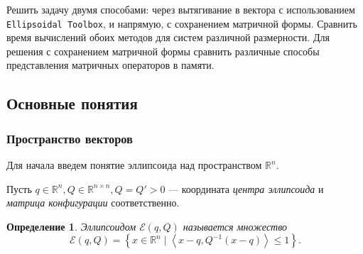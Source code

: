 \documentclass[12pt]{article}
\theoremstyle{rusdef}
\newtheorem{definition}{Определение}
\newcommand{\scalar}[2]{\left<#1,#2\right>}
\newcommand{\R}{\ensuremath{\mathbb{R}}} %
\newcommand{\E}{\ensuremath{\mathcal{E}}} %
\begin{document}
Решить задачу двумя способами: через вытягивание в вектора с использованием \texttt{Ellipsoidal Toolbox}, и напрямую, с сохранением матричной формы. Сравнить время вычислений обоих методов для систем различной размерности. Для решения с сохранением матричной формы сравнить различные способы представления матричных операторов в памяти.
\newpage


\subsection{Основные понятия}
\subsubsection*{Пространство векторов}
Для начала введем понятие эллипсоида над пространством $\R^n$.

Пусть $q \in \R^n, Q \in \R^{n \times n}, Q = Q' > 0$ --- координата \textit{центра эллипсоида} и \textit{матрица конфигурации} соответственно.

\begin{definition}
Эллипсоидом $\E(q,Q)$ называется множество
$$
\E(q,Q) = \left\{ x \in \R^n \mid \scalar{x-q}{Q^{-1}(x-q)} \leqslant 1 \right\}.
$$
\end{definition}
\end{document}

